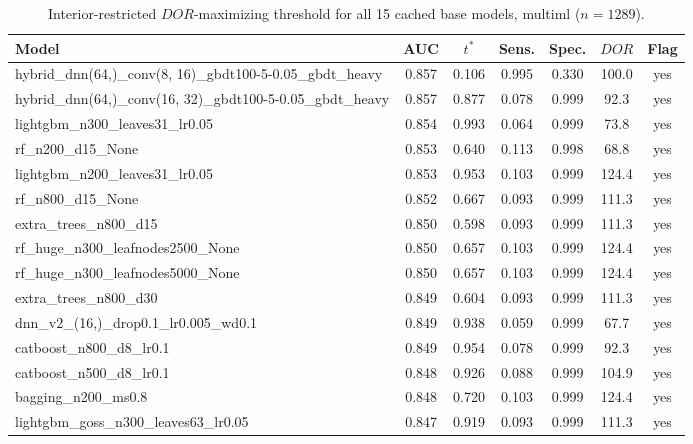 \documentclass[11pt]{article}
\begin{document}
\begin{table}[ht]
\centering
\small
\caption{Interior-restricted $DOR$-maximizing threshold for all 15 cached base models, multiml ($n=1289$).}
\label{tab:full-multiml}
\begin{tabular}{lcccccc}
\toprule
Model & AUC & $t^\ast$ & Sens. & Spec. & $DOR$ & Flag \\
\midrule
hybrid\_dnn(64,)\_conv(8, 16)\_gbdt100-5-0.05\_gbdt\_heavy & 0.857 & 0.106 & 0.995 & 0.330 & 100.0 & yes \\
hybrid\_dnn(64,)\_conv(16, 32)\_gbdt100-5-0.05\_gbdt\_heavy & 0.857 & 0.877 & 0.078 & 0.999 & 92.3 & yes \\
lightgbm\_n300\_leaves31\_lr0.05 & 0.854 & 0.993 & 0.064 & 0.999 & 73.8 & yes \\
rf\_n200\_d15\_None & 0.853 & 0.640 & 0.113 & 0.998 & 68.8 & yes \\
lightgbm\_n200\_leaves31\_lr0.05 & 0.853 & 0.953 & 0.103 & 0.999 & 124.4 & yes \\
rf\_n800\_d15\_None & 0.852 & 0.667 & 0.093 & 0.999 & 111.3 & yes \\
extra\_trees\_n800\_d15 & 0.850 & 0.598 & 0.093 & 0.999 & 111.3 & yes \\
rf\_huge\_n300\_leafnodes2500\_None & 0.850 & 0.657 & 0.103 & 0.999 & 124.4 & yes \\
rf\_huge\_n300\_leafnodes5000\_None & 0.850 & 0.657 & 0.103 & 0.999 & 124.4 & yes \\
extra\_trees\_n800\_d30 & 0.849 & 0.604 & 0.093 & 0.999 & 111.3 & yes \\
dnn\_v2\_(16,)\_drop0.1\_lr0.005\_wd0.1 & 0.849 & 0.938 & 0.059 & 0.999 & 67.7 & yes \\
catboost\_n800\_d8\_lr0.1 & 0.849 & 0.954 & 0.078 & 0.999 & 92.3 & yes \\
catboost\_n500\_d8\_lr0.1 & 0.848 & 0.926 & 0.088 & 0.999 & 104.9 & yes \\
bagging\_n200\_ms0.8 & 0.848 & 0.720 & 0.103 & 0.999 & 124.4 & yes \\
lightgbm\_goss\_n300\_leaves63\_lr0.05 & 0.847 & 0.919 & 0.093 & 0.999 & 111.3 & yes \\
\bottomrule
\end{tabular}
\end{table}
\end{document}
